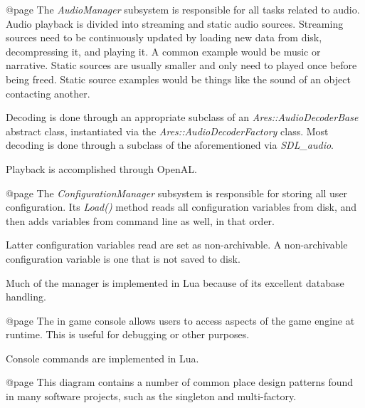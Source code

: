     {}

@page
The {\sl AudioManager} subsystem is responsible for all tasks related to audio. Audio playback is divided into streaming and static audio sources. Streaming sources need to be continuously updated by loading new data from disk, decompressing it, and playing it. A common example would be music or narrative. Static sources are usually smaller and only need to played once before being freed. Static source examples would be things like the sound of an object contacting another.

Decoding is done through an appropriate subclass of an {\sl Ares::AudioDecoderBase} abstract class, instantiated via the {\sl Ares::AudioDecoderFactory} class. Most decoding is done through a subclass of the aforementioned via {\sl SDL_audio}.

Playback is accomplished through OpenAL.

    {}


@page
The {\sl ConfigurationManager} subsystem is responsible for storing all user configuration. Its {\sl Load()} method reads all configuration variables from disk, and then adds variables from command line as well, in that order. 

Latter configuration variables read are set as non-archivable. A non-archivable configuration variable is one that is not saved to disk.

Much of the manager is implemented in Lua because of its excellent database handling.

    {}

@page
The in game console allows users to access aspects of the game engine at runtime. This is useful for debugging or other purposes.

Console commands are implemented in Lua.

    {}

@page
This diagram contains a number of common place design patterns found in many software projects, such as the singleton and multi-factory. 


